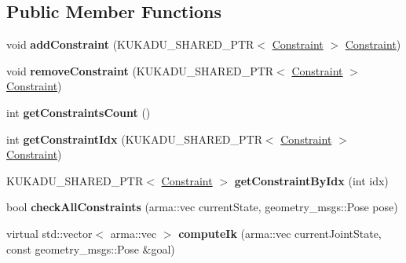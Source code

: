 \subsection*{Public Member Functions}
\begin{DoxyCompactItemize}
\item 
\hypertarget{classkukadu_1_1Kinematics_af6a06ce0d0a1170148de4e8efcbbfa4b}{void {\bfseries add\-Constraint} (K\-U\-K\-A\-D\-U\-\_\-\-S\-H\-A\-R\-E\-D\-\_\-\-P\-T\-R$<$ \hyperlink{classkukadu_1_1Constraint}{Constraint} $>$ \hyperlink{classkukadu_1_1Constraint}{Constraint})}\label{classkukadu_1_1Kinematics_af6a06ce0d0a1170148de4e8efcbbfa4b}

\item 
\hypertarget{classkukadu_1_1Kinematics_a53ec74274ab1b0fd3df081a16ca35926}{void {\bfseries remove\-Constraint} (K\-U\-K\-A\-D\-U\-\_\-\-S\-H\-A\-R\-E\-D\-\_\-\-P\-T\-R$<$ \hyperlink{classkukadu_1_1Constraint}{Constraint} $>$ \hyperlink{classkukadu_1_1Constraint}{Constraint})}\label{classkukadu_1_1Kinematics_a53ec74274ab1b0fd3df081a16ca35926}

\item 
\hypertarget{classkukadu_1_1Kinematics_a4eb2b717f47bf4d28a82bfded60f75b6}{int {\bfseries get\-Constraints\-Count} ()}\label{classkukadu_1_1Kinematics_a4eb2b717f47bf4d28a82bfded60f75b6}

\item 
\hypertarget{classkukadu_1_1Kinematics_a99b99eaa016107fb4b0d8f6f87396a65}{int {\bfseries get\-Constraint\-Idx} (K\-U\-K\-A\-D\-U\-\_\-\-S\-H\-A\-R\-E\-D\-\_\-\-P\-T\-R$<$ \hyperlink{classkukadu_1_1Constraint}{Constraint} $>$ \hyperlink{classkukadu_1_1Constraint}{Constraint})}\label{classkukadu_1_1Kinematics_a99b99eaa016107fb4b0d8f6f87396a65}

\item 
\hypertarget{classkukadu_1_1Kinematics_a59ed85e60fb4d6b82bc5e145a55b1e56}{K\-U\-K\-A\-D\-U\-\_\-\-S\-H\-A\-R\-E\-D\-\_\-\-P\-T\-R$<$ \hyperlink{classkukadu_1_1Constraint}{Constraint} $>$ {\bfseries get\-Constraint\-By\-Idx} (int idx)}\label{classkukadu_1_1Kinematics_a59ed85e60fb4d6b82bc5e145a55b1e56}

\item 
\hypertarget{classkukadu_1_1Kinematics_a685f76d61feec05ba02fb8f82c30bc63}{bool {\bfseries check\-All\-Constraints} (arma\-::vec current\-State, geometry\-\_\-msgs\-::\-Pose pose)}\label{classkukadu_1_1Kinematics_a685f76d61feec05ba02fb8f82c30bc63}

\item 
\hypertarget{classkukadu_1_1Kinematics_ac9215d036bbdfab163745ade3033910e}{virtual std\-::vector$<$ arma\-::vec $>$ {\bfseries compute\-Ik} (arma\-::vec current\-Joint\-State, const geometry\-\_\-msgs\-::\-Pose \&goal)}\label{classkukadu_1_1Kinematics_ac9215d036bbdfab163745ade3033910e}


\end{DoxyCompactItemize}
